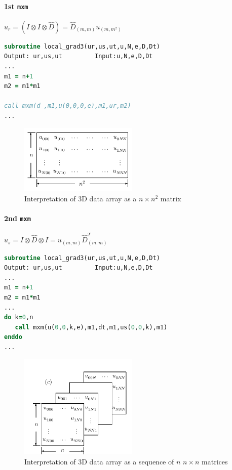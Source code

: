 \documentclass[
  a4paper,
  10pt]{article}
\begin{document}
\hypertarget{st-mxm}{%
\paragraph{\texorpdfstring{1st \texttt{mxm}}{1st mxm}}\label{st-mxm}}

\(u_r = (I \otimes I \otimes \hat{D}) = \hat{D}_{(m, m)} u_{(m, m^2)}\)

\begin{lstlisting}[language=Fortran]
subroutine local_grad3(ur,us,ut,u,N,e,D,Dt)
Output: ur,us,ut         Input:u,N,e,D,Dt
...
m1 = n+1
m2 = m1*m1

call mxm(d ,m1,u(0,0,0,e),m1,ur,m2)
...
\end{lstlisting}

\begin{figure}
\centering
\includegraphics[width=0.5\textwidth,height=\textheight]{figs/b7cef4a74c1cb5eb009b3d833f658ba806965cab.png}
\caption{Interpretation of 3D data array as a \(n \times n^2\) matrix}
\end{figure}

\hypertarget{nd-mxm}{%
\paragraph{\texorpdfstring{2nd \texttt{mxm}}{2nd mxm}}\label{nd-mxm}}

\(u_{s} = I \otimes \hat{D} \otimes I = u_{(m, m)} \hat{D}^T_{(m, m)}\)

\begin{lstlisting}[language=Fortran]
subroutine local_grad3(ur,us,ut,u,N,e,D,Dt)
Output: ur,us,ut         Input:u,N,e,D,Dt
...
m1 = n+1
m2 = m1*m1
...
do k=0,n
   call mxm(u(0,0,k,e),m1,dt,m1,us(0,0,k),m1)
enddo
...
\end{lstlisting}

\begin{figure}
\centering
\includegraphics[width=0.5\textwidth,height=\textheight]{figs/c8583cc0161a26f00fca48847ad5cebd79ea0e65.png}
\caption{Interpretation of 3D data array as a sequence of \(n\)
\(n \times n\) matrices}
\end{figure}
\end{document}
